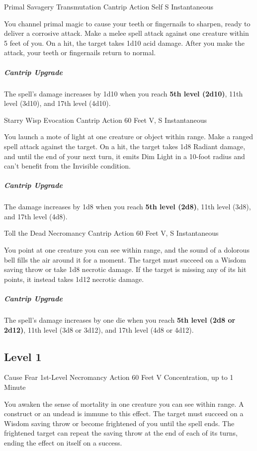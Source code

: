 \documentclass[letterpaper,openany,oneside,twocolumn]{book}
\begin{document}
\DndSpellHeader
  {Primal Savagery}
  {Transmutation Cantrip}
  {Action}
  {Self}
  {S}
  {Instantaneous}

You channel primal magic to cause your teeth or fingernails to sharpen, ready to deliver a corrosive attack. Make a melee spell attack against one creature within 5 feet of you. On a hit, the target takes 1d10 acid damage. After you make the attack, your teeth or fingernails return to normal.

\subparagraph*{Cantrip Upgrade} The spell's damage increases by 1d10 when you reach \textbf{5th level (2d10)}, 11th level (3d10), and 17th level (4d10).

\DndSpellHeader
  {Starry Wisp}
  {Evocation Cantrip}
  {Action}
  {60 Feet}
  {V, S}
  {Instantaneous}

You launch a mote of light at one creature or object within range. Make a ranged spell attack against the target. On a hit, the target takes 1d8 Radiant damage, and until the end of your next turn, it emits Dim Light in a 10-foot radius and can't benefit from the Invisible condition.

\subparagraph*{Cantrip Upgrade} The damage increases by 1d8 when you reach \textbf{5th level (2d8)}, 11th level (3d8), and 17th level (4d8).

\DndSpellHeader
  {Toll the Dead}
  {Necromancy Cantrip}
  {Action}
  {60 Feet}
  {V, S}
  {Instantaneous}

You point at one creature you can see within range, and the sound of a dolorous bell fills the air around it for a moment. The target must succeed on a Wisdom saving throw or take 1d8 necrotic damage. If the target is missing any of its hit points, it instead takes 1d12 necrotic damage.

\subparagraph*{Cantrip Upgrade} The spell's damage increases by one die when you reach \textbf{5th level (2d8 or 2d12)}, 11th level (3d8 or 3d12), and 17th level (4d8 or 4d12).

\subsection*{Level 1}

\DndSpellHeader
  {Cause Fear}
  {1st-Level Necromancy}
  {Action}
  {60 Feet}
  {V}
  {Concentration, up to 1 Minute}

You awaken the sense of mortality in one creature you can see within range. A construct or an undead is immune to this effect. The target must succeed on a Wisdom saving throw or become frightened of you until the spell ends. The frightened target can repeat the saving throw at the end of each of its turns, ending the effect on itself on a success.
\end{document}
